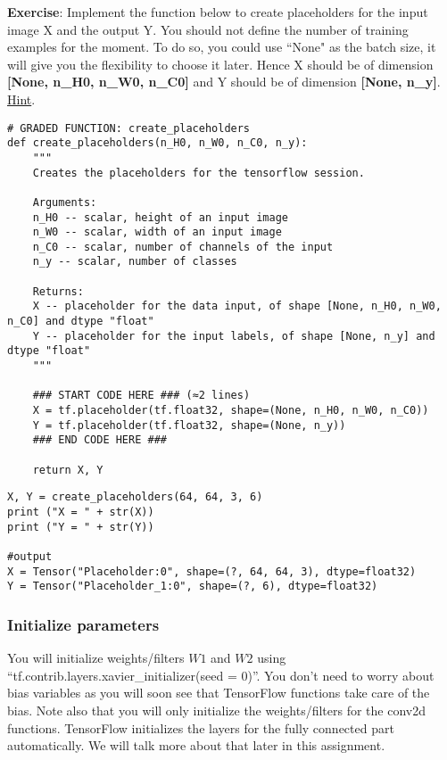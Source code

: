 {\textbf{Exercise}}: Implement the function below to create placeholders for the input image X and the output Y. You should not define the number of training examples for the moment. To do so, you could use ``None" as the batch size, it will give you the flexibility to choose it later. Hence X should be of dimension {\textbf{[None, n\_H0, n\_W0, n\_C0]}} and Y should be of dimension {\textbf{[None, n\_y]}}.  \href{https://www.tensorflow.org/api_docs/python/tf/placeholder}{Hint}.
\begin{verbatim}
# GRADED FUNCTION: create_placeholders
def create_placeholders(n_H0, n_W0, n_C0, n_y):
    """
    Creates the placeholders for the tensorflow session.
    
    Arguments:
    n_H0 -- scalar, height of an input image
    n_W0 -- scalar, width of an input image
    n_C0 -- scalar, number of channels of the input
    n_y -- scalar, number of classes
        
    Returns:
    X -- placeholder for the data input, of shape [None, n_H0, n_W0, n_C0] and dtype "float"
    Y -- placeholder for the input labels, of shape [None, n_y] and dtype "float"
    """

    ### START CODE HERE ### (≈2 lines)
    X = tf.placeholder(tf.float32, shape=(None, n_H0, n_W0, n_C0))
    Y = tf.placeholder(tf.float32, shape=(None, n_y))
    ### END CODE HERE ###
    
    return X, Y
\end{verbatim}

\begin{verbatim}
X, Y = create_placeholders(64, 64, 3, 6)
print ("X = " + str(X))
print ("Y = " + str(Y))

#output
X = Tensor("Placeholder:0", shape=(?, 64, 64, 3), dtype=float32)
Y = Tensor("Placeholder_1:0", shape=(?, 6), dtype=float32)
\end{verbatim}



\subsubsection{Initialize parameters}

You will initialize weights/filters $W1$ and $W2$ using ``tf.contrib.layers.xavier\_initializer(seed = 0)''. You don't need to worry about bias variables as you will soon see that TensorFlow functions take care of the bias. Note also that you will only initialize the weights/filters for the conv2d functions. TensorFlow initializes the layers for the fully connected part automatically. We will talk more about that later in this assignment.

